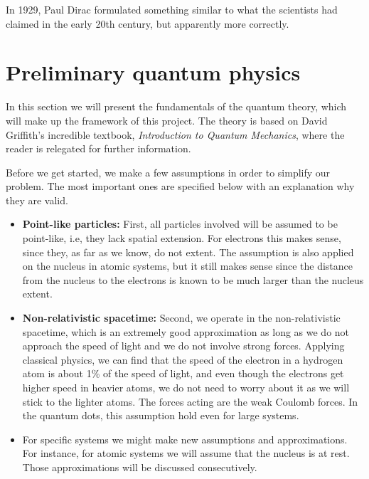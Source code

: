 In 1929, Paul Dirac formulated something similar to what the scientists had claimed in the early 20th century, but apparently more correctly. \cite{dirac_paul_adrien_maurice_quantum_1929}

\section{Preliminary quantum physics} \label{sec:elementary}
In this section we will present the fundamentals of the quantum theory, which will make up the framework of this project. The theory is based on David Griffith's incredible textbook, \textit{Introduction to Quantum Mechanics}, where the reader is relegated for further information.

Before we get started, we make a few assumptions in order to simplify our problem. The most important ones are specified below with an explanation why they are valid.

\begin{itemize}
	\item \textbf{Point-like particles:} First, all particles involved will be assumed to be point-like, i.e, they lack spatial extension. For electrons this makes sense, since they, as far as we know, do not extent. The assumption is also applied on the nucleus in atomic systems, but it still makes sense since the distance from the nucleus to the electrons is known to be much larger than the nucleus extent.
	
	\item \textbf{Non-relativistic spacetime:}  Second, we operate in the non-relativistic spacetime, which is an extremely good approximation as long as we do not approach the speed of light and we do not involve strong forces. Applying classical physics, we can find that the speed of the electron in a hydrogen atom is about 1\% of the speed of light, and even though the electrons get higher speed in heavier atoms, we do not need to worry about it as we will stick to the lighter atoms. The forces acting are the weak Coulomb forces. In the quantum dots, this assumption hold even for large systems.
	
	\item For specific systems we might make new assumptions and approximations. For instance, for atomic systems we will assume that the nucleus is at rest. Those approximations will be discussed consecutively. 
\end{itemize}

